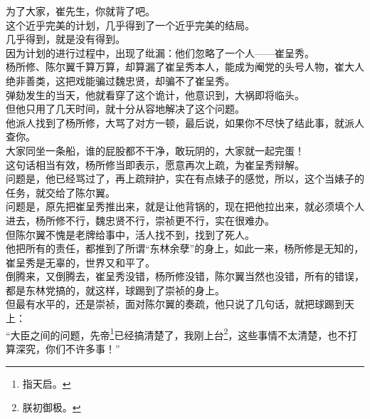 \begin{multicols}{\theparacolNo}
为了大家，崔先生，你就背了吧。\\

这个近乎完美的计划，几乎得到了一个近乎完美的结局。\\

几乎得到，就是没有得到。\\

因为计划的进行过程中，出现了纰漏：他们忽略了一个人——崔呈秀。\\

杨所修、陈尔翼千算万算，却算漏了崔呈秀本人，能成为阉党的头号人物，崔大人绝非善类，这把戏能骗过魏忠贤，却骗不了崔呈秀。\\

弹劾发生的当天，他就看穿了这个诡计，他意识到，大祸即将临头。\\

但他只用了几天时间，就十分从容地解决了这个问题。\\

他派人找到了杨所修，大骂了对方一顿，最后说，如果你不尽快了结此事，就派人查你。\\

大家同坐一条船，谁的屁股都不干净，敢玩阴的，大家就一起完蛋！\\

这句话相当有效，杨所修当即表示，愿意再次上疏，为崔呈秀辩解。\\

问题是，他已经骂过了，再上疏辩护，实在有点婊子的感觉，所以，这个当婊子的任务，就交给了陈尔翼。\\

问题是，原先把崔呈秀推出来，就是让他背锅的，现在把他拉出来，就必须填个人进去，杨所修不行，魏忠贤不行，崇祯更不行，实在很难办。\\

但陈尔翼不愧是老牌给事中，活人找不到，找到了死人。\\

他把所有的责任，都推到了所谓“东林余孽”的身上，如此一来，杨所修是无知的，崔呈秀是无辜的，世界又和平了。\\

倒腾来，又倒腾去，崔呈秀没错，杨所修没错，陈尔翼当然也没错，所有的错误，都是东林党搞的，就这样，球踢到了崇祯的身上。\\

但最有水平的，还是崇祯，面对陈尔翼的奏疏，他只说了几句话，就把球踢到天上：\\

“大臣之间的问题，先帝\footnote{指天启。}已经搞清楚了，我刚上台\footnote{朕初御极。}，这些事情不太清楚，也不打算深究，你们不许多事！”\\


\end{multicols}
